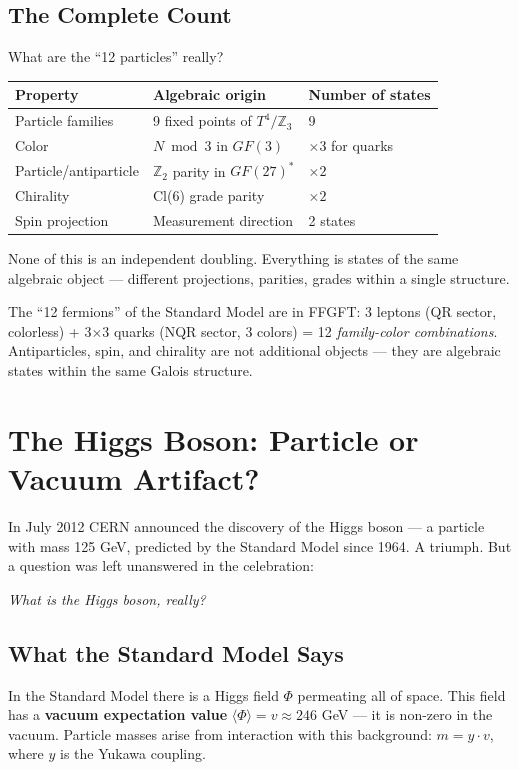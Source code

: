 \documentclass[11pt,oneside]{book}
\begin{document}
\section*{The Complete Count}

What are the ``12 particles'' really?

\begin{center}
\small
\begin{tabular}{lll}
\toprule
Property & Algebraic origin & Number of states \\
\midrule
Particle families & 9 fixed points of $T^4/\mathbb{Z}_3$ & 9 \\
Color & $N \bmod 3$ in $GF(3)$ & $\times 3$ for quarks \\
Particle/antiparticle & $\mathbb{Z}_2$ parity in $GF(27)^*$ & $\times 2$ \\
Chirality & Cl(6) grade parity & $\times 2$ \\
Spin projection & Measurement direction & 2 states \\
\bottomrule
\end{tabular}
\end{center}

None of this is an independent doubling. Everything is states of the
same algebraic object --- different projections, parities, grades
within a single structure.

The ``12 fermions'' of the Standard Model are in FFGFT: 3 leptons
(QR sector, colorless) + 3×3 quarks (NQR sector, 3 colors) = 12
\textit{family-color combinations}. Antiparticles, spin, and chirality
are not additional objects --- they are algebraic states within the
same Galois structure.

\chapter{The Higgs Boson: Particle or Vacuum Artifact?}

In July 2012 CERN announced the discovery of the Higgs boson --- a particle
with mass 125 GeV, predicted by the Standard Model since 1964. A triumph.
But a question was left unanswered in the celebration:

\textit{What is the Higgs boson, really?}

\section*{What the Standard Model Says}

In the Standard Model there is a Higgs field $\Phi$ permeating all of
space. This field has a \textbf{vacuum expectation value}
$\langle\Phi\rangle = v \approx 246$ GeV --- it is non-zero in the vacuum.
Particle masses arise from interaction with this background: $m = y \cdot v$,
where $y$ is the Yukawa coupling.
\end{document}
